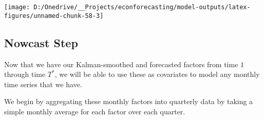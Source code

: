 \documentclass[11pt, letterpaper]{article}\usepackage[]{graphicx}\usepackage[]{color}
\begin{document}
{\centering \texttt{[image: D:/Onedrive/\_\_Projects/econforecasting/model-outputs/latex-figures/unnamed-chunk-58-3]} 

}





\subsection{Nowcast Step}
Now that we have our Kalman-smoothed and forecasted factors from time $1$ through time $T^*$, we will be able to use these as covariates to model any monthly time series that we have.

We begin by aggregating these monthly factors into quarterly data by taking a simple monthly average for each factor over each quarter.
\end{document}
